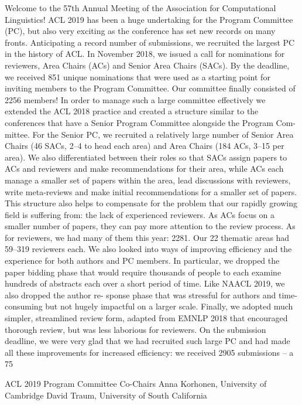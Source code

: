 Welcome to the 57th Annual Meeting of the Association for Computational Linguistics! ACL 2019 has been a huge undertaking for the Program Committee (PC), but also very exciting as the conference has set new records on many fronts.
Anticipating a record number of submissions, we recruited the largest PC in the history of ACL. In November 2018, we issued a call for nominations for reviewers, Area Chairs (ACs) and Senior Area Chairs (SACs). By the deadline, we received 851 unique nominations that were used as a starting point for inviting members to the Program Committee. Our committee finally consisted of 2256 members!
In order to manage such a large committee effectively we extended the ACL 2018 practice and created a structure similar to the conferences that have a Senior Program Committee alongside the Program Com- mittee. For the Senior PC, we recruited a relatively large number of Senior Area Chairs (46 SACs, 2–4 to head each area) and Area Chairs (184 ACs, 3–15 per area). We also differentiated between their roles so that SACs assign papers to ACs and reviewers and make recommendations for their area, while ACs each manage a smaller set of papers within the area, lead discussions with reviewers, write meta-reviews and make initial recommendations for a smaller set of papers. This structure also helps to compensate for the problem that our rapidly growing field is suffering from: the lack of experienced reviewers. As ACs focus on a smaller number of papers, they can pay more attention to the review process. As for reviewers, we had many of them this year: 2281. Our 22 thematic areas had 59–319 reviewers each.
We also looked into ways of improving efficiency and the experience for both authors and PC members. In particular, we dropped the paper bidding phase that would require thousands of people to each examine hundreds of abstracts each over a short period of time. Like NAACL 2019, we also dropped the author re- sponse phase that was stressful for authors and time-consuming but not hugely impactful on a larger scale. Finally, we adopted much simpler, streamlined review form, adapted from EMNLP 2018 that encouraged thorough review, but was less laborious for reviewers.
On the submission deadline, we were very glad that we had recruited such large PC and had made all these improvements for increased efficiency: we received 2905 submissions – a 75%

ACL 2019 Program Committee Co-Chairs
Anna Korhonen, University of Cambridge
David Traum, University of South California